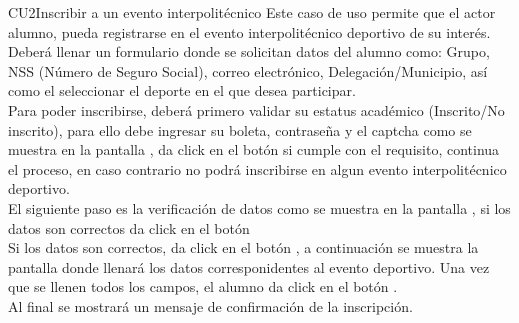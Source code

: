 \begin{UseCase}{CU2}{Inscribir a un evento interpolitécnico}{
		\noindent Este caso de uso permite que el actor alumno, pueda registrarse en el evento interpolitécnico deportivo de su interés. Deberá llenar un formulario donde se solicitan datos del alumno como: Grupo, NSS (Número de Seguro Social), correo electrónico, Delegación/Municipio, así como el seleccionar el deporte en el que desea participar.\\
        Para poder inscribirse, deberá primero validar su estatus académico (Inscrito/No inscrito), para ello debe ingresar su boleta, contraseña y el captcha como se muestra en la pantalla , da click en el botón  si cumple con el requisito, continua el proceso, en caso contrario no podrá inscribirse en algun evento interpolitécnico deportivo.\\
        El siguiente paso es la verificación de datos como se muestra en la pantalla , si los datos son correctos da click en el botón \\
        Si los datos son correctos, da click en el botón , a continuación se muestra la pantalla  donde llenará los datos corresponidentes al evento deportivo. Una vez que se llenen todos los campos, el alumno da click en el botón .\\ 
        Al final se mostrará un mensaje de confirmación de la inscripción.
	}
\end{UseCase}
